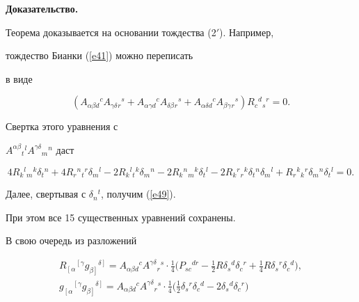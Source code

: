 {\bf Доказательство.}


Теорема доказывается на основании тождества (2$'$). Например,


тождество Бианки (\ref{e41}) можно переписать


в виде


$$


\label{e56}


(A_{\alpha\beta d}{}^cA_{\gamma\delta}{}_r{}^s+


A_{\alpha\gamma d}{}^cA_{\delta\beta}{}_r{}^s+


A_{\alpha\delta d}{}^cA_{\beta\gamma}{}_r{}^s)


R_c{}^d{}_s{}^r=0.


$$


Свертка этого уравнения с


$A^{\alpha\beta}{}_t{}^lA^{\gamma\delta}{}_m{}^n$ даст


$$


\label{e57}


4R_k{}^l{}_m{}^k\delta_t{}^n+


4R_r{}^n{}_t{}^r\delta_m{}^l-


2R_k{}^l{}_t{}^k\delta_m{}^n-


2R_k{}^n{}_m{}^k\delta_t{}^l-


2R_k{}^r{}_r{}^k\delta_t{}^n\delta_m{}^l+


R_r{}^k{}_k{}^r\delta_m{}^n\delta_t{}^l=0.


$$


Далее, свертывая с $\delta_n{}^t$, получим (\ref{e49}).


При этом все 15 существенных уравнений сохранены.


В свою очередь из разложений


\begin{gather*}


R_{\left[\alpha \right.}{}^{\left[ \gamma \right.}


g_{\left.\beta \right]}{}^{\left. \delta \right]}=


A_{\alpha\beta d}{}^cA^{\gamma\delta}{}_r{}^s


\cdot\frac{1}{4}\bigg(P_{sc}{}^{dr}-\frac{1}{2}R\delta_s{}^d\delta_c{}^r+


\frac{1}{4}R\delta_s{}^r\delta_c{}^d\bigg),\\


%


g_{\left[\alpha \right.}{}^{\left[ \gamma \right.}


g_{\left.\beta \right]}{}^{\left. \delta \right]}=


A_{\alpha\beta d}{}^cA^{\gamma\delta}{}_r{}^s


\cdot\frac{1}{4}\bigg(\frac{1}{2}\delta_s{}^r\delta_c{}^d-


2\delta_s{}^d\delta_c{}^r\bigg)


\end{gather*}


